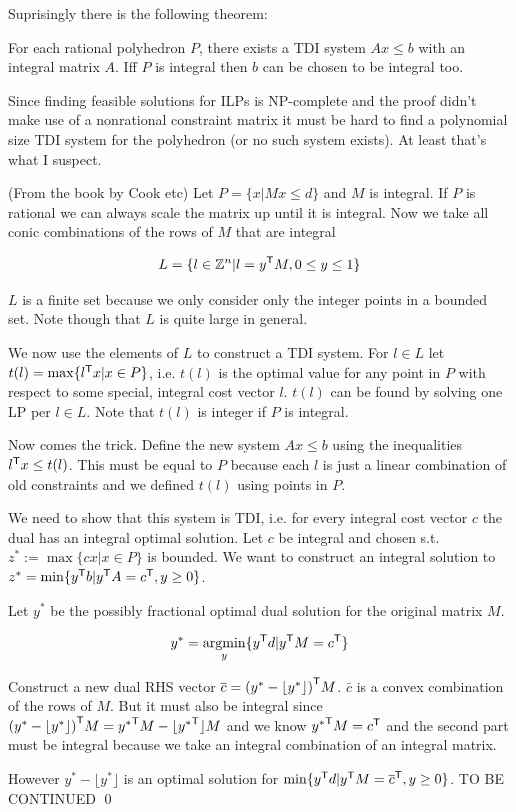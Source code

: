 Suprisingly there is the following theorem:

\begin{thm}\label{existsTDIsystem} For each rational polyhedron $P$, there exists a TDI system $Ax\leq b$ with an integral matrix $A$. Iff $P$ is integral then $b$ can be chosen to be integral too.
\end{thm}

Since finding feasible solutions for ILPs is NP-complete and the proof didn't make use of a nonrational constraint matrix it must be hard to find a polynomial size TDI system for the polyhedron (or no such system exists). At least that's what I suspect.

\begin{pr} (From the book by Cook etc) Let $P=\{x | Mx\leq d\}$ and $M$ is integral. If $P$ is rational we can always scale the matrix up until it is integral. Now we take all conic combinations of the rows of $M$ that are integral

\[L=\{l\in \mathbb{Z}^n | l = {y}^\text{\upshape \sffamily T} M, 0\leq y\leq 1\}\]

$L$ is a finite set because we only consider only the integer points in a bounded set. Note though that $L$ is quite large in general.

We now use the elements of $L$ to construct a TDI system. For $l\in L$ let $t(l) = \max\{{l}^\text{\upshape \sffamily T} x | x\in P\}$, i.e. $t(l)$ is the optimal value for any point in $P$ with respect to some special, integral cost vector $l$. $t(l)$ can be found by solving one LP per $l\in L$. Note that $t(l)$ is integer if $P$ is integral.

Now comes the trick. Define the new system $Ax\leq b$ using the inequalities ${l}^\text{\upshape \sffamily T}x\leq t(l)$. This must be equal to $P$ because each $l$ is just a linear combination of old constraints and we defined $t(l)$ using points in $P$.

We need to show that this system is TDI, i.e. for every integral cost vector $c$ the dual has an integral optimal solution. Let $c$ be integral and chosen s.t. $z^*:=\max \{cx|x\in P\}$ is bounded. We want to construct an integral solution to $z^*=\min \{{y}^\text{\upshape \sffamily T}b | {y}^\text{\upshape \sffamily T} A = {c}^\text{\upshape \sffamily T}, y\geq 0\}$.

Let $y^*$ be the possibly fractional optimal dual solution for the original matrix $M$. 

\[y^* = \underset{y}{\operatorname{argmin}} \{{y}^\text{\upshape \sffamily T} d| {y}^\text{\upshape \sffamily T} M = {c}^\text{\upshape \sffamily T}\}\]

Construct a new dual RHS vector $\overline c = {(y^*-\lfloor y^*\rfloor)}^\text{\upshape \sffamily T}M$. $\bar c$ is a convex combination of the rows of $M$. But it must also be integral since ${(y^*-\lfloor y^*\rfloor)}^\text{\upshape \sffamily T}M={y^*}^\text{\upshape \sffamily T}M-\lfloor{y^*}^\text{\upshape \sffamily T}\rfloor M$ and we know ${y^*}^\text{\upshape \sffamily T}M={c}^\text{\upshape \sffamily T}$ and the second part must be integral because we take an integral combination of an integral matrix.

However $y^*-\lfloor y^*\rfloor$ is an optimal solution for $\min \{{y}^\text{\upshape \sffamily T} d| {y}^\text{\upshape \sffamily T}M={\overline c}^\text{\upshape \sffamily T},y\geq 0\}$. TO BE CONTINUED
\qed \end{pr}

